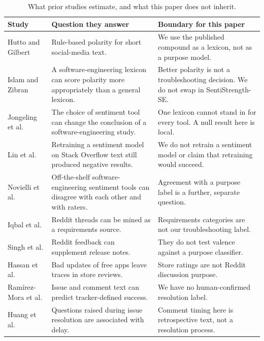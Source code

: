 \documentclass[conference,letterpaper]{IEEEtran}
\begin{document}
\begin{table}[t]
\caption{What prior studies estimate, and what this paper does not inherit.}
\label{tab:prior}
\centering
\footnotesize
\begin{tabularx}{\textwidth}{lXX}
\toprule
Study & Question they answer & Boundary for this paper \\
\midrule
Hutto and Gilbert \cite{Hutto2014VADER} & Rule-based polarity for short social-media text. & We use the published compound as a lexicon, not as a purpose model. \\
Islam and Zibran \cite{Islam2018SentiStrengthSE} & A software-engineering lexicon can score polarity more appropriately than a general lexicon. & Better polarity is not a troubleshooting decision. We do not swap in SentiStrength-SE. \\
Jongeling et al. \cite{Jongeling2017Negative} & The choice of sentiment tool can change the conclusion of a software-engineering study. & One lexicon cannot stand in for every tool. A null result here is local. \\
Lin et al. \cite{Lin2018HowFar} & Retraining a sentiment model on Stack Overflow text still produced negative results. & We do not retrain a sentiment model or claim that retraining would succeed. \\
Novielli et al. \cite{Novielli2021Replication} & Off-the-shelf software-engineering sentiment tools can disagree with each other and with raters. & Agreement with a purpose label is a further, separate question. \\
Iqbal et al. \cite{Iqbal2021Reddit} & Reddit threads can be mined as a requirements source. & Requirements categories are not our troubleshooting label. \\
Singh et al. \cite{Singh2024ReleaseNotes} & Reddit feedback can supplement release notes. & They do not test valence against a purpose classifier. \\
Hassan et al. \cite{Hassan2020BadUpdates} & Bad updates of free apps leave traces in store reviews. & Store ratings are not Reddit discussion purpose. \\
Ram{\'i}rez-Mora et al. \cite{RamirezMora2020Issues} & Issue and comment text can predict tracker-defined success. & We have no human-confirmed resolution label. \\
Huang et al. \cite{Huang2019Questions} & Questions raised during issue resolution are associated with delay. & Comment timing here is retrospective text, not a resolution process. \\
\bottomrule
\end{tabularx}
\end{table}
\end{document}
